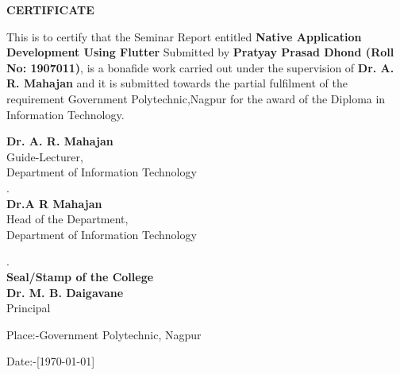 
\begin{center}
{\Large{\bf{CERTIFICATE}}}
\end{center}

\noindent

This is to certify that the Seminar Report entitled \textbf{Native Application Development Using Flutter} Submitted by \textbf{Pratyay Prasad Dhond (Roll No: 1907011)}, is a bonafide work carried out under the supervision of \textbf{Dr. A. R. Mahajan} and it is submitted towards the partial fulfilment of the requirement Government Polytechnic,Nagpur for the award of the Diploma in Information Technology.
\vskip 0.6in
\begin{center}
\begin{multicols}{2}
{ \bf Dr. A. R. Mahajan}\\Guide-Lecturer,\\Department of Information Technology\\.\\
{\bf Dr.A R Mahajan}\\Head of the Department,\\Department of Information Technology\\

\end{multicols}
\end{center}
\vskip 0.4in
\begin{center}
\begin{multicols}{2}

.\\{\bf Seal/Stamp of the College}\\
{\bf \large Dr. M. B. Daigavane}\\{Principal}

\end{multicols}
\end{center}
\vspace{2cm}

\noindent Place:-Government Polytechnic, Nagpur \hfill 

\noindent Date:-[\today]

\clearpage

